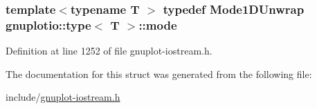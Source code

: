 \subsubsection[{\texorpdfstring{mode}{mode}}]{\setlength{\rightskip}{0pt plus 5cm}template$<$typename T $>$ typedef {\bf Mode1\+D\+Unwrap} gnuplotio\+::type$<$ T $>$\+::{\bf mode}}\hypertarget{structgnuplotio_1_1_mode_auto_decoder_3_01_t_00_01typename_01boost_1_1enable__if__c_3_01_07_arra8faa7fb46cef74a29a23f22c000e4a99_a9c16f714b67e1c4b38e5c7ff956e8acc}{}\label{structgnuplotio_1_1_mode_auto_decoder_3_01_t_00_01typename_01boost_1_1enable__if__c_3_01_07_arra8faa7fb46cef74a29a23f22c000e4a99_a9c16f714b67e1c4b38e5c7ff956e8acc}


Definition at line 1252 of file gnuplot-\/iostream.\+h.



The documentation for this struct was generated from the following file\+:\begin{DoxyCompactItemize}
\item 
include/\hyperlink{gnuplot-iostream_8h}{gnuplot-\/iostream.\+h}\end{DoxyCompactItemize}
